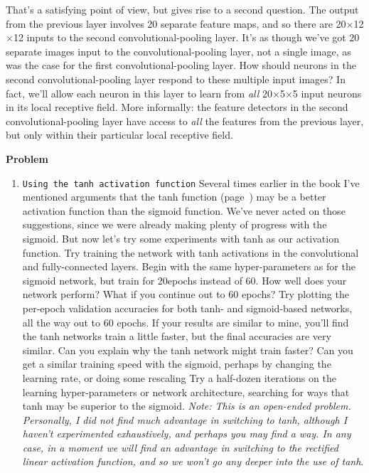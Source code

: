 That's a satisfying point of view, but gives rise to a second question. The output from the previous layer involves 20 separate feature maps, and so there are 20$\times$12$\times$12 inputs to the second convolutional-pooling layer. It's as though we've got 20 separate images input to the convolutional-pooling layer, not a single image, as was the case for the first convolutional-pooling layer. How should neurons in the second convolutional-pooling layer respond to these multiple input images? In fact, we'll allow each neuron in this layer to learn from \textit{all} 20$\times$5$\times$5 input neurons in its local receptive field. More informally: the feature detectors in the second convolutional-pooling layer have access to \textit{all} the features from the previous layer, but only within their particular local receptive field.


\textbf{Problem}
\begin{enumerate}
\item \lstinline{Using the tanh activation function} Several times earlier in the book I've mentioned arguments that the tanh function (page~\pageref{sec:Othermodelsofartificialneuron}) may be a better activation function than the sigmoid function. We've never acted on those suggestions, since we were already making plenty of progress with the sigmoid. But now let's try some experiments with tanh as our activation function. Try training the network with tanh activations in the convolutional and fully-connected layers. Begin with the same hyper-parameters as for the sigmoid network, but train for 20epochs instead of 60. How well does your network perform? What if you continue out to 60 epochs? Try plotting the per-epoch validation accuracies for both tanh- and sigmoid-based networks, all the way out to 60 epochs. If your results are similar to mine, you'll find the tanh networks train a little faster, but the final accuracies are very similar. Can you explain why the tanh network might train faster? Can you get a similar training speed with the sigmoid, perhaps by changing the learning rate, or doing some rescaling Try a half-dozen iterations on the learning hyper-parameters or network architecture, searching for ways that tanh may be superior to the sigmoid. \textit{Note: This is an open-ended problem. Personally, I did not find much advantage in switching to tanh, although I haven't experimented exhaustively, and perhaps you may find a way. In any case, in a moment we will find an advantage in switching to the rectified linear activation function, and so we won't go any deeper into the use of tanh}. 
\end{enumerate}

